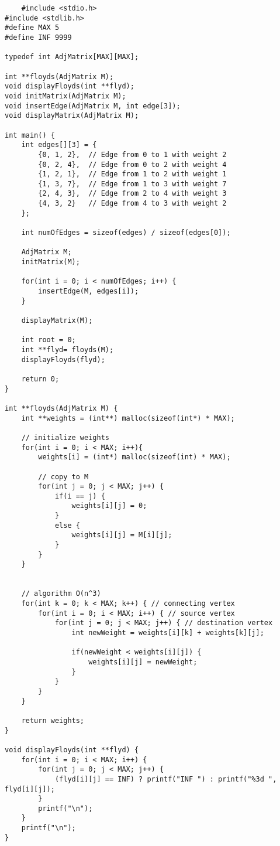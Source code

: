 \documentclass{book}
\begin{document}
\onecolumn
\begin{verbatim}
    #include <stdio.h>
#include <stdlib.h>
#define MAX 5
#define INF 9999

typedef int AdjMatrix[MAX][MAX];

int **floyds(AdjMatrix M);
void displayFloyds(int **flyd);
void initMatrix(AdjMatrix M);
void insertEdge(AdjMatrix M, int edge[3]);
void displayMatrix(AdjMatrix M);

int main() {
    int edges[][3] = {
        {0, 1, 2},  // Edge from 0 to 1 with weight 2
        {0, 2, 4},  // Edge from 0 to 2 with weight 4
        {1, 2, 1},  // Edge from 1 to 2 with weight 1
        {1, 3, 7},  // Edge from 1 to 3 with weight 7
        {2, 4, 3},  // Edge from 2 to 4 with weight 3
        {4, 3, 2}   // Edge from 4 to 3 with weight 2
    };

    int numOfEdges = sizeof(edges) / sizeof(edges[0]);
    
    AdjMatrix M;
    initMatrix(M);

    for(int i = 0; i < numOfEdges; i++) {
        insertEdge(M, edges[i]);
    }

    displayMatrix(M);

    int root = 0;
    int **flyd= floyds(M);
    displayFloyds(flyd);

    return 0;
}

int **floyds(AdjMatrix M) {
    int **weights = (int**) malloc(sizeof(int*) * MAX);

    // initialize weights
    for(int i = 0; i < MAX; i++){
        weights[i] = (int*) malloc(sizeof(int) * MAX);

        // copy to M
        for(int j = 0; j < MAX; j++) {
            if(i == j) {
                weights[i][j] = 0;
            }
            else {
                weights[i][j] = M[i][j];
            }
        }
    }


    // algorithm O(n^3)
    for(int k = 0; k < MAX; k++) { // connecting vertex
        for(int i = 0; i < MAX; i++) { // source vertex
            for(int j = 0; j < MAX; j++) { // destination vertex
                int newWeight = weights[i][k] + weights[k][j];

                if(newWeight < weights[i][j]) {
                    weights[i][j] = newWeight;
                } 
            }
        }
    }

    return weights;
}

void displayFloyds(int **flyd) {
    for(int i = 0; i < MAX; i++) {
        for(int j = 0; j < MAX; j++) {
            (flyd[i][j] == INF) ? printf("INF ") : printf("%3d ", flyd[i][j]);
        }
        printf("\n");
    }
    printf("\n");
} 


\end{verbatim}
\end{document}
